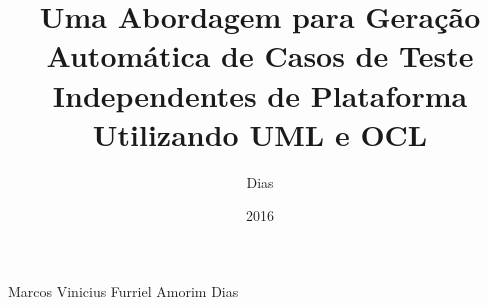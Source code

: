 \title{Uma Abordagem para Geração Automática de Casos de Teste Independentes de Plataforma Utilizando UML e OCL}


\author{Dias}{Marcos Vinicius Furriel Amorim Dias}
\date{2016}
\maketitle
